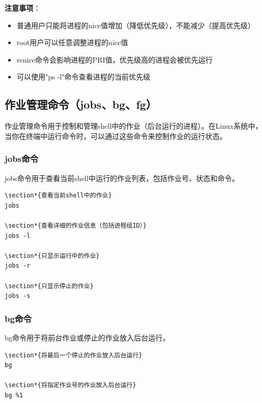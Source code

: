 \documentclass[12pt,UTF8]{ctexbook}
\begin{document}
\textbf{注意事项}：
\begin{itemize}
    \item 普通用户只能将进程的nice值增加（降低优先级），不能减少（提高优先级）
    \item root用户可以任意调整进程的nice值
    \item renice命令会影响进程的PRI值，优先级高的进程会被优先运行
    \item 可以使用"ps -l"命令查看进程的当前优先级
\end{itemize}

\subsection{作业管理命令（jobs、bg、fg）}
作业管理命令用于控制和管理shell中的作业（后台运行的进程）。在Linux系统中，当你在终端中运行命令时，可以通过这些命令来控制作业的运行状态。

\subsubsection{jobs命令}
jobs命令用于查看当前shell中运行的作业列表，包括作业号、状态和命令。

\begin{verbatim}
\section*{查看当前shell中的作业}
jobs

\section*{查看详细的作业信息（包括进程组ID）}
jobs -l

\section*{只显示运行中的作业}
jobs -r

\section*{只显示停止的作业}
jobs -s
\end{verbatim}

\subsubsection{bg命令}
bg命令用于将前台作业或停止的作业放入后台运行。

\begin{verbatim}
\section*{将最后一个停止的作业放入后台运行}
bg

\section*{将指定作业号的作业放入后台运行}
bg %1
\end{verbatim}
\end{document}
